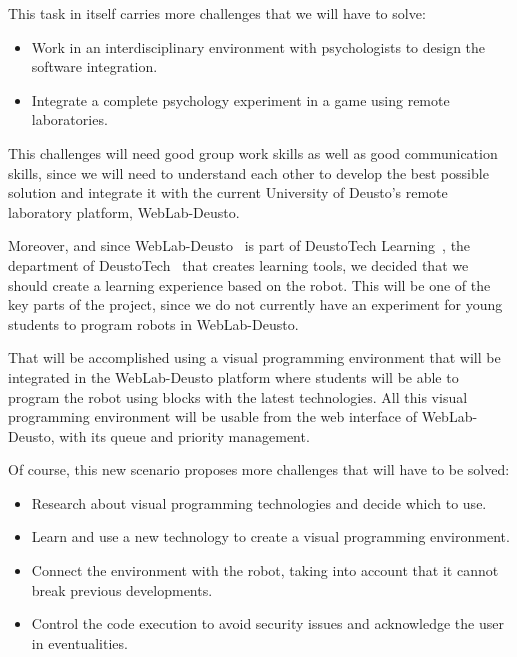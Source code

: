 This task in itself carries more challenges that we will have to solve:

\begin{itemize}

\item Work in an interdisciplinary environment with psychologists to design the software
integration.

\item Integrate a complete psychology experiment in a game using remote laboratories.

\end{itemize}

This challenges will need good group work skills as well as good communication skills, since we will
need to understand each other to develop the best possible solution and integrate it with the
current University of Deusto's remote laboratory platform, WebLab-Deusto.

Moreover, and since WebLab-Deusto~\cite{weblab_web} is part of DeustoTech
Learning~\cite{dtlearning_web}, the department of DeustoTech~\cite{deustotech_web} that creates
learning tools, we decided that we should create a learning experience based on the robot. This will
be one of the key parts of the project, since we do not currently have an experiment for young
students to program robots in WebLab-Deusto.

That will be accomplished using a visual programming environment that will be integrated in the
WebLab-Deusto platform where students will be able to program the robot using blocks with the latest
technologies. All this visual programming environment will be usable from the web interface of
WebLab-Deusto, with its queue and priority management.

Of course, this new scenario proposes more challenges that will have to be solved:

\begin{itemize}

\item Research about visual programming technologies and decide which to use.

\item Learn and use a new technology to create a visual programming environment.

\item Connect the environment with the robot, taking into account that it cannot break previous
developments.

\item Control the code execution to avoid security issues and acknowledge the user in eventualities.

\end{itemize}

